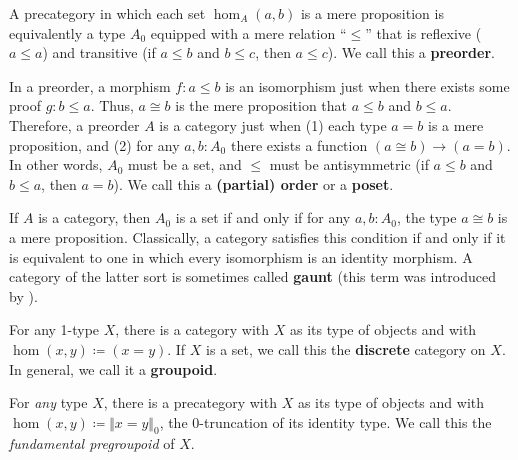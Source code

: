\documentclass{mscs}
\newcommand{\defeq}{\coloneqq}  %
\newcommand{\trunc}[2]{\Vert #2\Vert_{#1}}
\def\pizero{\trunc0}
\numberwithin{equation}{section}
\begin{document}
\begin{eg}\label{ct:orders}
  A precategory in which each set $\hom_A(a,b)$ is a mere proposition is equivalently a type $A_0$ equipped with a mere relation ``$\le$'' that is reflexive ($a\le a$) and transitive (if $a\le b$ and $b\le c$, then $a\le c$).
  We call this a \textbf{preorder}.

  In a preorder, a morphism $f\colon a\le b$ is an isomorphism just when there exists some proof $g\colon b\le a$.
  Thus, $a\cong b$ is the mere proposition that $a\le b$ and $b\le a$.
  Therefore, a preorder $A$ is a category just when (1) each type $a=b$ is a mere proposition, and (2) for any $a,b:A_0$ there exists a function $(a\cong b) \to (a=b)$.
  In other words, $A_0$ must be a set, and $\le$ must be antisymmetric (if $a\le b$ and $b\le a$, then $a=b$).
  We call this a \textbf{(partial) order} or a \textbf{poset}.
\end{eg}

\begin{eg}\label{ct:gaunt}
  If $A$ is a category, then $A_0$ is a set if and only if for any $a,b:A_0$, the type $a\cong b$ is a mere proposition.
  Classically, a category satisfies this condition if and only if it is equivalent to one in which every isomorphism is an identity morphism.
  A category of the latter sort is sometimes called \textbf{gaunt} (this term was introduced by \textcite{bsp12infncats}).
\end{eg}

\begin{eg}\label{ct:discrete}
  For any 1-type $X$, there is a category with $X$ as its type of objects and with $\hom(x,y) \defeq (x=y)$.
  If $X$ is a set, we call this the \textbf{discrete} category on $X$.
  In general, we call it a \textbf{groupoid}.
\end{eg}

\begin{eg}\label{ct:fundgpd}
  For \emph{any} type $X$, there is a precategory with $X$ as its type of objects and with $\hom(x,y) \defeq \pizero{x=y}$, the 0-truncation of its identity type.
  We call this the \emph{fundamental pregroupoid} of $X$.
\end{eg}
\end{document}
